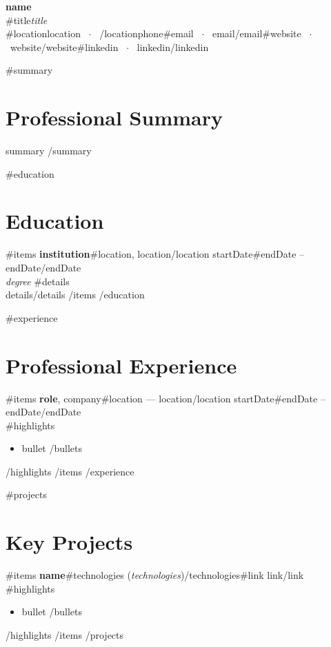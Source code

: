 \documentclass[10pt,letterpaper]{article}
\begin{document}
\pagestyle{empty}

\begin{center}
    {\huge \textbf{{{name}}}} \\ \vspace{4pt}
    {{#title}}{\large \textit{{{title}}}} \\ 
    \small {{#location}}{{location}} \ $\cdot$ \ {{/location}}{{phone}}{{#email}} \ $\cdot$ \ {{email}}{{/email}}{{#website}} \ $\cdot$ \ {{website}}{{/website}}{{#linkedin}} \ $\cdot$ \ {{linkedin}}{{/linkedin}}
\end{center}

{{#summary}}
\section{Professional Summary}
{{summary}}
{{/summary}}

{{#education}}
\section{Education}
{{#items}}
\textbf{{{institution}}}{{#location}}, {{location}}{{/location}} \hfill {{startDate}}{{#endDate}} -- {{endDate}}{{/endDate}} \\
\textit{{{degree}}}
{{#details}}\\\small {{details}}{{/details}}
\vspace{4pt}
{{/items}}
{{/education}}

{{#experience}}
\section{Professional Experience}
{{#items}}
\textbf{{{role}}}, {{company}}{{#location}} --- {{location}}{{/location}} \hfill {{startDate}}{{#endDate}} -- {{endDate}}{{/endDate}} \\
{{#highlights}}
\begin{itemize}[leftmargin=1.5em,noitemsep,topsep=2pt]
{{#bullets}}
    \item {{bullet}}
{{/bullets}}
\end{itemize}
{{/highlights}}
\vspace{4pt}
{{/items}}
{{/experience}}

{{#projects}}
\section{Key Projects}
{{#items}}
\textbf{{{name}}}{{#technologies}} (\textit{{{technologies}}}){{/technologies}}{{#link}} \hfill {{link}}{{/link}}
{{#highlights}}
\begin{itemize}[leftmargin=1.5em,noitemsep,topsep=2pt]
{{#bullets}}
    \item {{bullet}}
{{/bullets}}
\end{itemize}
{{/highlights}}
\vspace{4pt}
{{/items}}
{{/projects}}
\end{document}
